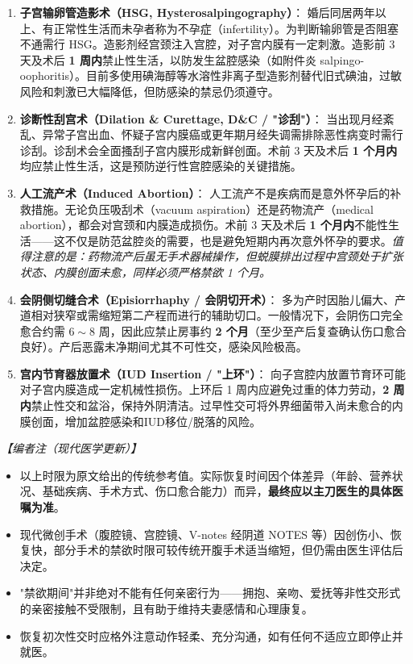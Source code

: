 \begin{enumerate}
\begin{enumerate}
	\item \textbf{子宫输卵管造影术（HSG, Hysterosalpingography）}：
	婚后同居两年以上、有正常性生活而未孕者称为不孕症（infertility）。为判断输卵管是否阻塞不通需行 HSG。造影剂经宫颈注入宫腔，对子宫内膜有一定刺激。造影前 3 天及术后 \textbf{1 周内}禁止性生活，以防发生盆腔感染（如附件炎 salpingo-oophoritis）。目前多使用碘海醇等水溶性非离子型造影剂替代旧式碘油，过敏风险和刺激已大幅降低，但防感染的禁忌仍须遵守。

	\item \textbf{诊断性刮宫术（Dilation \& Curettage, D\&C / "诊刮"）}：
	当出现月经紊乱、异常子宫出血、怀疑子宫内膜癌或更年期月经失调需排除恶性病变时需行诊刮。诊刮术会全面搔刮子宫内膜形成新鲜创面。术前 3 天及术后 \textbf{1 个月内}均应禁止性生活，这是预防逆行性宫腔感染的关键措施。

	\item \textbf{人工流产术（Induced Abortion）}：
	人工流产不是疾病而是意外怀孕后的补救措施。无论负压吸刮术（vacuum aspiration）还是药物流产（medical abortion），都会对宫颈和内膜造成损伤。术前 3 天及术后 \textbf{1 个月内}不能性生活——这不仅是防范盆腔炎的需要，也是避免短期内再次意外怀孕的要求。\textit{值得注意的是：药物流产后虽无手术器械操作，但蜕膜排出过程中宫颈处于扩张状态、内膜创面未愈，同样必须严格禁欲 1 个月。}

	\item \textbf{会阴侧切缝合术（Episiorrhaphy / 会阴切开术）}：
	多为产时因胎儿偏大、产道相对狭窄或需缩短第二产程而进行的辅助切口。一般情况下，会阴伤口完全愈合约需 $6\sim8$ 周，因此应禁止房事约 \textbf{2 个月}（至少至产后复查确认伤口愈合良好）。产后恶露未净期间尤其不可性交，感染风险极高。

	\item \textbf{宫内节育器放置术（IUD Insertion / "上环"）}：
	向子宫腔内放置节育环可能对子宫内膜造成一定机械性损伤。上环后 1 周内应避免过重的体力劳动，\textbf{2 周内}禁止性交和盆浴，保持外阴清洁。过早性交可将外界细菌带入尚未愈合的内膜创面，增加盆腔感染和IUD移位/脱落的风险。
\end{enumerate}

\noindent\textit{【编者注（现代医学更新）】}
\begin{itemize}
	\item 以上时限为原文给出的传统参考值。实际恢复时间因个体差异（年龄、营养状况、基础疾病、手术方式、伤口愈合能力）而异，\textbf{最终应以主刀医生的具体医嘱为准}。
	\item 现代微创手术（腹腔镜、宫腔镜、V-notes 经阴道 NOTES 等）因创伤小、恢复快，部分手术的禁欲时限可较传统开腹手术适当缩短，但仍需由医生评估后决定。
	\item "禁欲期间"并非绝对不能有任何亲密行为——拥抱、亲吻、爱抚等非性交形式的亲密接触不受限制，且有助于维持夫妻感情和心理康复。
	\item 恢复初次性交时应格外注意动作轻柔、充分沟通，如有任何不适应立即停止并就医。
\end{itemize}


\end{enumerate}
